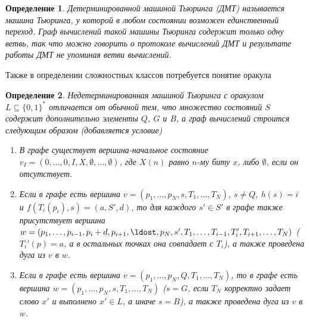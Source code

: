 \documentclass[14pt, a4paper]{extreport}
\newtheorem{definition}{\indent Определение}
\newcommand{\word}{\{0, 1\}^*}
\begin{document}
\begin{definition}
    Детерминированной машиной Тьюринга (ДМТ) называется машина Тьюринга, у которой в любом состоянии возможен единственный переход. Граф вычислений такой машины Тьюринга содержит только одну ветвь, так что можно говорить о протоколе вычислений ДМТ и результате работы ДМТ не упоминая ветви вычислений.
\end{definition}
Также в определении сложностных классов потребуется понятие оракула
\begin{definition}
    Недетерминированная машиной Тьюринга с оракулом $L \subseteq \word$ отличается от обычной тем, что множество состояний $S$ содержит дополнительно элементы $Q$, $G$ и $B$, а граф вычислений строится следующим образом (добавляется условие)
    \begin{enumerate}
        \item В графе существует вершина-начальное состояние $v_I = \left(0, \ldots, 0, I, X, \emptyset, \ldots, \emptyset\right)$, где $X(n)$ равно $n$-му биту $x$, либо $\emptyset$, если он отсутствует.
        \item Если в графе есть вершина $v = \left(p_1, \ldots, p_N, s, T_1, \ldots, T_N\right)$, $s \neq Q$, $h(s) = i$ и $f(T_i(p_i), s) = (a, S', d)$, то для каждого $s' \in S'$ в графе также присутствует вершина $w = \left(p_1, \ldots, p_{i-1}, p_i + d, p_{i+1}, \ldost, p_N, s', T_1, \ldots, T_{i-1}, T'_i, T_{i+1}, \ldots, T_N\right)$ ($T_i'(p) = a$, а в остальных точках она совпадает с $T_i$), а также проведена дуга из $v$ в $w$.
        \item Если в графе есть вершина $v = \left(p_1, \ldots, p_N, Q, T_1, \ldots, T_N\right)$, то в графе есть вершина $w = \left(p_1, \ldots, p_N, s, T_1, \ldots, T_N\right)$ ($s = G$, если $T_N$ корректно задает слово $x'$ и выполнено $x' \in L$, а иначе $s = B$), а также проведена дуга из $v$ в $w$.

    \end{enumerate}

\end{definition}
\end{document}
